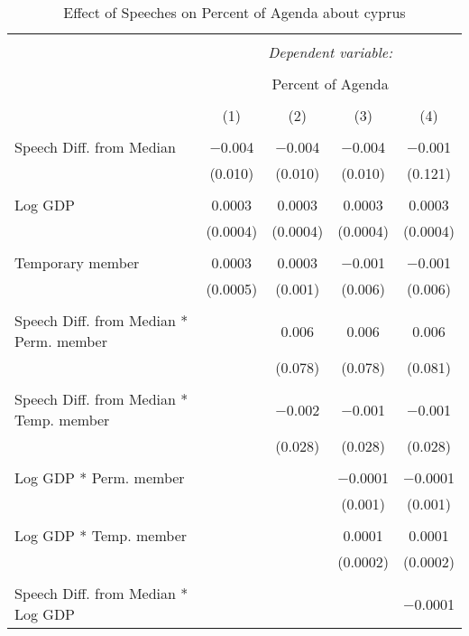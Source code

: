 
\begin{table}[!htbp] \centering 
  \caption{Effect of Speeches on Percent of Agenda about cyprus} 
  \label{} 
\begin{tabular}{@{\extracolsep{5pt}}lcccc} 
\\[-1.8ex]\hline 
\hline \\[-1.8ex] 
 & \multicolumn{4}{c}{\textit{Dependent variable:}} \\ 
\cline{2-5} 
\\[-1.8ex] & \multicolumn{4}{c}{Percent of Agenda} \\ 
\\[-1.8ex] & (1) & (2) & (3) & (4)\\ 
\hline \\[-1.8ex] 
 Speech Diff. from Median & $-$0.004 & $-$0.004 & $-$0.004 & $-$0.001 \\ 
  & (0.010) & (0.010) & (0.010) & (0.121) \\ 
  & & & & \\ 
 Log GDP & 0.0003 & 0.0003 & 0.0003 & 0.0003 \\ 
  & (0.0004) & (0.0004) & (0.0004) & (0.0004) \\ 
  & & & & \\ 
 Temporary member & 0.0003 & 0.0003 & $-$0.001 & $-$0.001 \\ 
  & (0.0005) & (0.001) & (0.006) & (0.006) \\ 
  & & & & \\ 
 Speech Diff. from Median * Perm. member &  & 0.006 & 0.006 & 0.006 \\ 
  &  & (0.078) & (0.078) & (0.081) \\ 
  & & & & \\ 
 Speech Diff. from Median * Temp. member &  & $-$0.002 & $-$0.001 & $-$0.001 \\ 
  &  & (0.028) & (0.028) & (0.028) \\ 
  & & & & \\ 
 Log GDP * Perm. member &  &  & $-$0.0001 & $-$0.0001 \\ 
  &  &  & (0.001) & (0.001) \\ 
  & & & & \\ 
 Log GDP * Temp. member &  &  & 0.0001 & 0.0001 \\ 
  &  &  & (0.0002) & (0.0002) \\ 
  & & & & \\ 
 Speech Diff. from Median * Log GDP &  &  &  & $-$0.0001 \\ 

\end{tabular}
\end{table}
